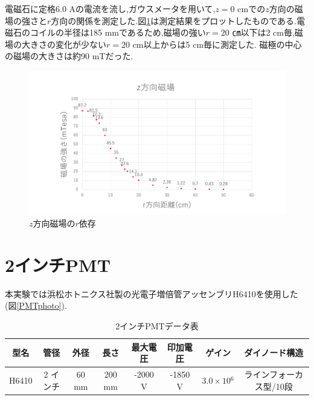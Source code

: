 \newpage
電磁石に定格6.0 Aの電流を流し,ガウスメータを用いて,$z=0$ cmでの$z$方向の磁場の強さと$r$方向の関係を測定した.図\ref{maggraph01}は測定結果をプロットしたものである.電磁石のコイルの半径は185 mmであるため,磁場の強い$r=20$ ㎝以下は2 cm毎,磁場の大きさの変化が少ない$r=20$ cm以上からは5 cm毎に測定した.
磁極の中心の磁場の大きさは約90 mTだった.
\begin{figure}[h!]
	\centering
	\includegraphics[width=15cm]{fig/iguchi/maggraph01.pdf}
	\caption{$z$方向磁場の$r$依存}
	\label{maggraph01}
\end{figure}


\newpage
\section{2インチPMT}
本実験では浜松ホトニクス社製の光電子増倍管アッセンブリH6410\cite{pmtH6410}を使用した(図\ref{PMTphoto}).

\begin{table}[tbp]
	\centering
	 \begin{tabular}{cccccccc}\hline
	型名& 管径 & 外径 & 長さ & 最大電圧 & 印加電圧 & ゲイン & ダイノード構造 \\ \hline \hline
	H6410 & 2 インチ & 60 mm & 200 mm & -2000 V & -1850 V & $3.0\times10{^{6}}$ &ラインフォーカス型/10段 \\ \hline
	\end{tabular}
	  \caption{2インチPMTデータ表}
\end{table}

